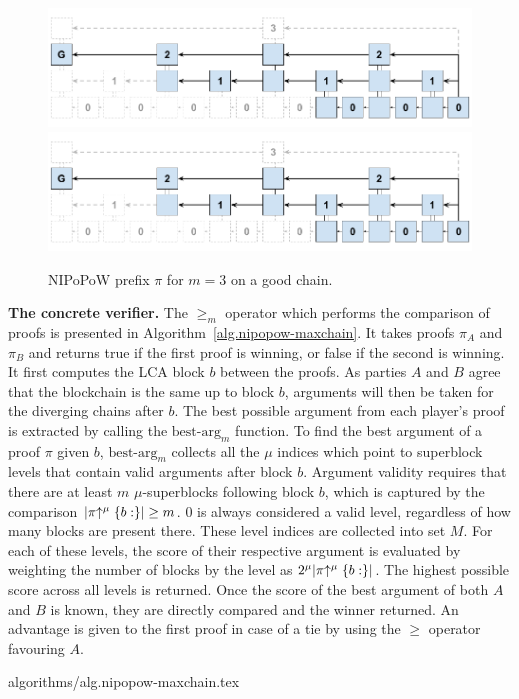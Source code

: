 \begin{figure}[h]
    \caption{
    NIPoPoW prefix $\pi$ for $m = 3$ on a good chain.
    }
    \centering
    \iftwocolumn
        \includegraphics[width=\columnwidth,keepaspectratio]{figures/non-interactive-popow.png}
    \else
        \includegraphics[width=0.7\columnwidth,keepaspectratio]{figures/non-interactive-popow.png}
    \fi
    \label{fig.nipopow}
\end{figure}

\noindent
\textbf{The concrete verifier.}
The $\geq_m$ operator which performs the
comparison of proofs is presented in Algorithm~\ref{alg.nipopow-maxchain}. It
takes proofs $\pi_A$ and $\pi_B$ and returns true if the first proof is winning,
or false if the second is winning. It first computes the LCA block $b$ between the
proofs. As parties $A$ and $B$ agree that the blockchain is the same up to block
$b$, arguments will then be taken for the diverging chains after $b$. The best
possible argument from each player's proof is extracted by calling the
$\text{best-arg}_m$ function.
To find the best argument of a proof $\pi$ given $b$, $\text{best-arg}_m$
collects all the $\mu$ indices which point to superblock levels that contain
valid arguments after block $b$. Argument validity requires that there are at
least $m$ $\mu$-superblocks following block $b$, which is captured by the
comparison $|\pi\negthickspace\uparrow^\mu\{b:\}| \geq m$. $0$ is always considered a valid
level, regardless of how many blocks are present there. These level indices are
collected into set $M$. For each of these levels, the score of their respective
argument is evaluated by weighting the number of blocks by the level as
$2^\mu|\pi\negthickspace\uparrow^\mu\{b:\}|$. The highest possible score across all levels is
returned. Once the score of the best argument of both $A$ and $B$ is known, they
are directly compared and the winner returned.  An advantage is given to the first proof in case of a tie by using the $\geq$ operator favouring $A$.

{algorithms/alg.nipopow-maxchain.tex}
